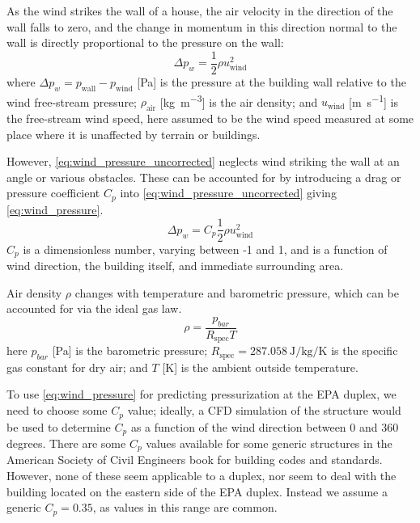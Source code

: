 As the wind strikes the wall of a house, the air velocity in the direction of the wall falls to zero, and the change in momentum in this direction normal to the wall is directly proportional to the pressure on the wall:
\begin{equation}\label{eq:wind_pressure_uncorrected}
  \Delta p_w = \frac{1}{2} \rho u_\mathrm{wind}^2
\end{equation}
where $\Delta p_w = p_\mathrm{wall} - p_\mathrm{wind}$ [\si{\pascal}] is the pressure at the building wall relative to the wind free-stream pressure;
$\rho_\mathrm{air}$ [\si{\kilo\gram\per\metre\cubed}] is the air density;
and $u_\mathrm{wind}$ [\si{\metre\per\second}] is the free-stream wind speed, here assumed to be the wind speed measured at some place where it is unaffected by terrain or buildings.\par

However, \eqref{eq:wind_pressure_uncorrected} neglects wind striking the wall at an angle or various obstacles.
These can be accounted for by introducing a drag or pressure coefficient $C_p$ into \eqref{eq:wind_pressure_uncorrected} giving \eqref{eq:wind_pressure}.
\begin{equation}\label{eq:wind_pressure}
  \Delta p_w = C_p \frac{1}{2} \rho u_\mathrm{wind}^2
\end{equation}
$C_p$ is a dimensionless number, varying between -1 and 1, and is a function of wind direction, the building itself, and immediate surrounding area.\par

Air density $\rho$ changes with temperature and barometric pressure, which can be accounted for via the ideal gas law.
\begin{equation}
  \rho = \frac{p_{bar}}{R_\mathrm{spec} T}
\end{equation}
here $p_{bar}$ [\si{\pascal}] is the barometric pressure;
$R_\mathrm{spec} = \SI{287.058}{\joule\per\kilogram\per\kelvin}$ is the specific gas constant for dry air;
and $T$ [\si{\kelvin}] is the ambient outside temperature.\par

To use \eqref{eq:wind_pressure} for predicting pressurization at the EPA duplex, we need to choose some $C_p$ value; ideally, a CFD simulation of the structure would be used to determine $C_p$ as a function of the wind direction between 0 and 360 degrees.
There are some $C_p$ values available for some generic structures in the American Society of Civil Engineers book for building codes and standards\cite{simiu_design_nodate}.
However, none of these seem applicable to a duplex, nor seem to deal with the building located on the eastern side of the EPA duplex.
Instead we assume a generic $C_p = 0.35$, as values in this range are common.


